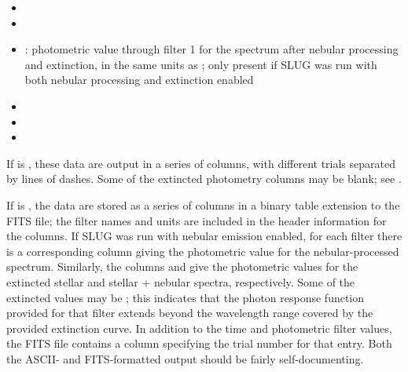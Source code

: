\documentclass[letterpaper,10pt,english]{sphinxmanual}
\begin{document}
\begin{itemize}
\item {} 

\item {} 

\item {} 
: photometric value through filter 1 for the spectrum after nebular processing and extinction, in the same units as ; only present if SLUG was run with both nebular processing and extinction enabled

\item {} 

\item {} 

\item {} 

\end{itemize}

If  is , these data are output in a series of columns, with different trials separated by lines of dashes. Some of the extincted photometry columns may be blank; see {\hyperref[\detokenize{output:ssec-int-phot-file}]{}}.

If  is , the data are stored as a series of
columns in a binary table extension to the FITS file; the filter names
and units are included in the header information for the columns. If
SLUG was run with nebular emission enabled, for each filter 
there is a corresponding column  giving the photometric
value for the nebular-processed spectrum. Similarly, the columns
 and  give the photometric values
for the extincted stellar and stellar + nebular spectra, respectively.
Some of the extincted values may be ; this
indicates that the photon response function provided for that filter
extends beyond the wavelength range covered by the provided extinction
curve. In addition to the time and photometric filter values, the FITS
file contains a column specifying the trial number for that
entry. Both the ASCII- and FITS-formatted output should be fairly
self-documenting.
\end{document}
